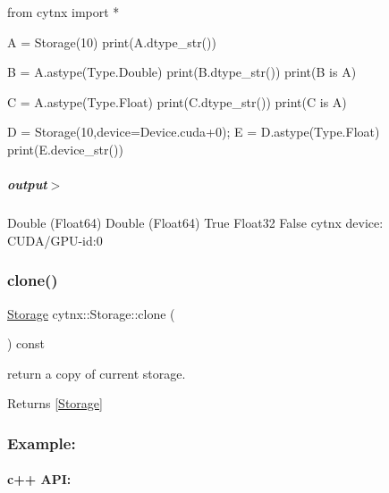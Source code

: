 \begin{DoxyCodeInclude}
\textcolor{keyword}{from} cytnx \textcolor{keyword}{import} *


A = Storage(10)
print(A.dtype\_str())

B = A.astype(Type.Double)
print(B.dtype\_str())
print(B \textcolor{keywordflow}{is} A)

C = A.astype(Type.Float)
print(C.dtype\_str())
print(C \textcolor{keywordflow}{is} A)

D = Storage(10,device=Device.cuda+0);
E = D.astype(Type.Float)
print(E.device\_str())

\end{DoxyCodeInclude}
 \subparagraph*{output$>$}


\begin{DoxyVerbInclude}
Double (Float64)
Double (Float64)
True
Float32
False
cytnx device: CUDA/GPU-id:0
\end{DoxyVerbInclude}
 \mbox{\label{classcytnx_1_1Storage_aed0530dd20f3fb352d45653ba46a3d50}} 
\subsubsection{\texorpdfstring{clone()}{clone()}}
{\footnotesize\ttfamily \hyperlink{classcytnx_1_1Storage}{Storage} cytnx\+::\+Storage\+::clone (\begin{DoxyParamCaption}{ }\end{DoxyParamCaption}) const\hspace{0.3cm}{\ttfamily [inline]}}



return a copy of current storage. 

\begin{DoxyReturn}{Returns}
\mbox{[}\hyperlink{classcytnx_1_1Storage}{Storage}\mbox{]}
\end{DoxyReturn}
\subsubsection*{Example\+:}

\paragraph*{c++ A\+PI\+:}


